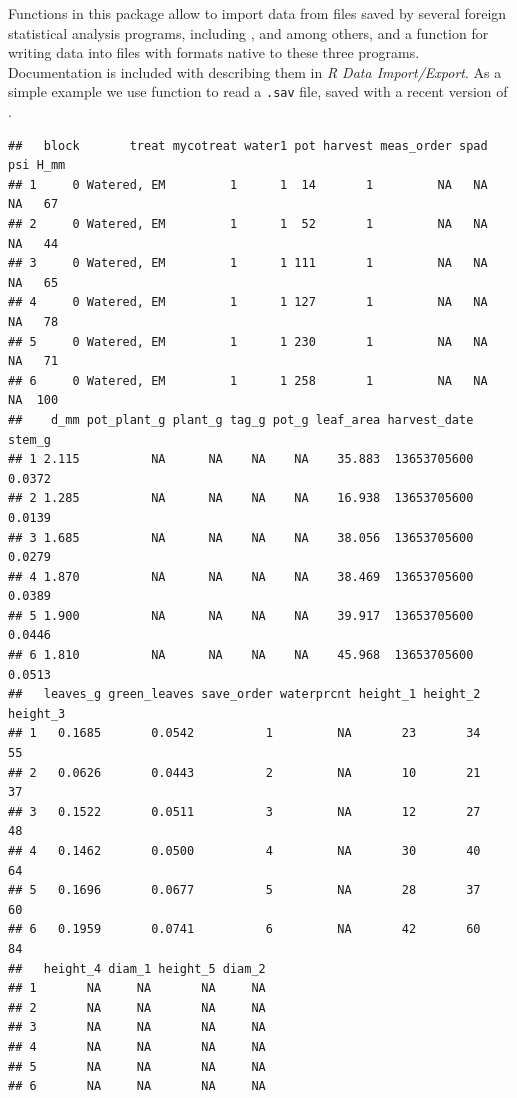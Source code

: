 \documentclass[krantz2]{krantz}\usepackage{knitr}%
\begin{document}
Functions in this package allow to import data from files saved by several foreign statistical analysis programs, including ,  and  among others, and a function for writing data into files with formats native to these three programs. Documentation is included with \Rlang describing them in \emph{R Data Import/Export}. As a simple example we use function  to read a \texttt{.sav} file, saved with a recent version of .

\begin{knitrout}\footnotesize
{}\color{fgcolor}\begin{kframe}
\begin{alltt}
 \hlkwb{<-} \hlstd{(} \hlstd{=} \hlstd{,}  \hlstd{=} \hlstd{)}
\end{alltt}


{\ttfamily\noindent\itshape\color{messagecolor}{\#\# re-encoding from UTF-8}}\begin{alltt}
\end{alltt}
\begin{verbatim}
##   block       treat mycotreat water1 pot harvest meas_order spad psi H_mm
## 1     0 Watered, EM         1      1  14       1         NA   NA  NA   67
## 2     0 Watered, EM         1      1  52       1         NA   NA  NA   44
## 3     0 Watered, EM         1      1 111       1         NA   NA  NA   65
## 4     0 Watered, EM         1      1 127       1         NA   NA  NA   78
## 5     0 Watered, EM         1      1 230       1         NA   NA  NA   71
## 6     0 Watered, EM         1      1 258       1         NA   NA  NA  100
##    d_mm pot_plant_g plant_g tag_g pot_g leaf_area harvest_date stem_g
## 1 2.115          NA      NA    NA    NA    35.883  13653705600 0.0372
## 2 1.285          NA      NA    NA    NA    16.938  13653705600 0.0139
## 3 1.685          NA      NA    NA    NA    38.056  13653705600 0.0279
## 4 1.870          NA      NA    NA    NA    38.469  13653705600 0.0389
## 5 1.900          NA      NA    NA    NA    39.917  13653705600 0.0446
## 6 1.810          NA      NA    NA    NA    45.968  13653705600 0.0513
##   leaves_g green_leaves save_order waterprcnt height_1 height_2 height_3
## 1   0.1685       0.0542          1         NA       23       34       55
## 2   0.0626       0.0443          2         NA       10       21       37
## 3   0.1522       0.0511          3         NA       12       27       48
## 4   0.1462       0.0500          4         NA       30       40       64
## 5   0.1696       0.0677          5         NA       28       37       60
## 6   0.1959       0.0741          6         NA       42       60       84
##   height_4 diam_1 height_5 diam_2
## 1       NA     NA       NA     NA
## 2       NA     NA       NA     NA
## 3       NA     NA       NA     NA
## 4       NA     NA       NA     NA
## 5       NA     NA       NA     NA
## 6       NA     NA       NA     NA
\end{verbatim}
\end{kframe}
\end{knitrout}
\end{document}
